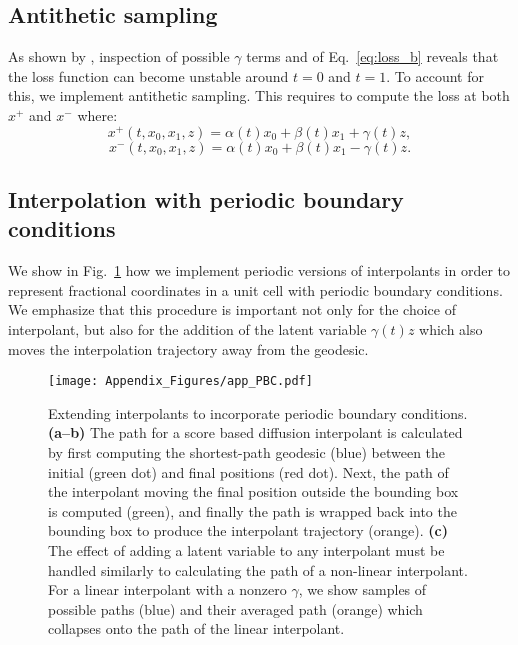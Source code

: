 \subsection{Antithetic sampling}

As shown by \citet{albergo_stochastic_2023}, inspection of possible $\gamma$ terms and of Eq.~\ref{eq:loss_b} reveals that the loss function can become unstable around $t=0$ and $t=1$. To account for this, we implement antithetic sampling. This requires to compute the loss at both $x^+$ and $x^-$ where:
\begin{equation}
    x^+(t,x_0,x_1,z) = \alpha(t) x_0 + \beta(t) x_1 + \gamma(t) z,
\end{equation}
\begin{equation}
    x^-(t,x_0,x_1,z) = \alpha(t) x_0 + \beta(t) x_1 - \gamma(t) z.
\end{equation}

\subsection{Interpolation with periodic boundary conditions}\label{app:SI_PBC}

We show in Fig.~\ref{fig:PBC} how we implement periodic versions of interpolants in order to represent fractional coordinates in a unit cell with periodic boundary conditions. We emphasize that this procedure is important not only for the choice of interpolant, but also for the addition of the latent variable $\gamma(t) z$ which also moves the interpolation trajectory away from the geodesic.

\begin{figure}[th]
   \centering
   \texttt{[image: Appendix\_Figures/app\_PBC.pdf]}
   \caption{Extending interpolants to incorporate periodic boundary conditions. \textbf{(a--b)} The path for a score based diffusion interpolant is calculated by first computing the shortest-path geodesic (blue) between the initial (green dot) and final positions (red dot). Next, the path of the interpolant moving the final position outside the bounding box is computed (green), and finally the path is wrapped back into the bounding box to produce the interpolant trajectory (orange). \textbf{(c)} The effect of adding a latent variable to any interpolant must be handled similarly to calculating the path of a non-linear interpolant. For a linear interpolant with a nonzero $\gamma$, we show samples of possible paths (blue) and their averaged path (orange) which collapses onto the path of the linear interpolant.}
   \label{fig:PBC}
\end{figure}

